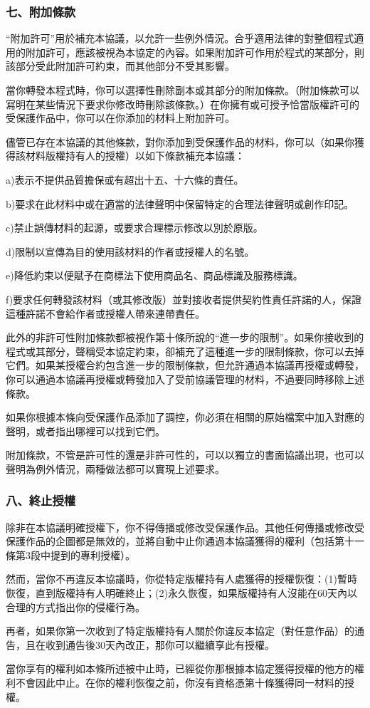 \subsubsection{七、附加條款}
“附加許可”用於補充本協議，以允許一些例外情況。合乎適用法律的對整個程式適用的附加許可，應該被視為本協定的內容。如果附加許可作用於程式的某部分，則該部分受此附加許可約束，而其他部分不受其影響。\par
當你轉發本程式時，你可以選擇性刪除副本或其部分的附加條款。（附加條款可以寫明在某些情況下要求你修改時刪除該條款。）在你擁有或可授予恰當版權許可的受保護作品中，你可以在你添加的材料上附加許可。\par
儘管已存在本協議的其他條款，對你添加到受保護作品的材料，你可以（如果你獲得該材料版權持有人的授權）以如下條款補充本協議：\par
a)表示不提供品質擔保或有超出十五、十六條的責任。\par
b)要求在此材料中或在適當的法律聲明中保留特定的合理法律聲明或創作印記。\par
c)禁止誤傳材料的起源，或要求合理標示修改以別於原版。\par
d)限制以宣傳為目的使用該材料的作者或授權人的名號。\par
e)降低約束以便賦予在商標法下使用商品名、商品標識及服務標識。\par
f)要求任何轉發該材料（或其修改版）並對接收者提供契約性責任許諾的人，保證這種許諾不會給作者或授權人帶來連帶責任。\par
此外的非許可性附加條款都被視作第十條所說的“進一步的限制”。如果你接收到的程式或其部分，聲稱受本協定約束，卻補充了這種進一步的限制條款，你可以去掉它們。如果某授權合約包含進一步的限制條款，但允許通過本協議再授權或轉發，你可以通過本協議再授權或轉發加入了受前協議管理的材料，不過要同時移除上述條款。\par
如果你根據本條向受保護作品添加了調控，你必須在相關的原始檔案中加入對應的聲明，或者指出哪裡可以找到它們。\par
附加條款，不管是許可性的還是非許可性的，可以以獨立的書面協議出現，也可以聲明為例外情況，兩種做法都可以實現上述要求。
\subsubsection{八、終止授權}
除非在本協議明確授權下，你不得傳播或修改受保護作品。其他任何傳播或修改受保護作品的企圖都是無效的，並將自動中止你通過本協議獲得的權利（包括第十一條第3段中提到的專利授權）。\par
然而，當你不再違反本協議時，你從特定版權持有人處獲得的授權恢復：(1)暫時恢復，直到版權持有人明確終止；(2)永久恢復，如果版權持有人沒能在60天內以合理的方式指出你的侵權行為。\par
再者，如果你第一次收到了特定版權持有人關於你違反本協定（對任意作品）的通告，且在收到通告後30天內改正，那你可以繼續享此有授權。\par
當你享有的權利如本條所述被中止時，已經從你那根據本協定獲得授權的他方的權利不會因此中止。在你的權利恢復之前，你沒有資格憑第十條獲得同一材料的授權。
